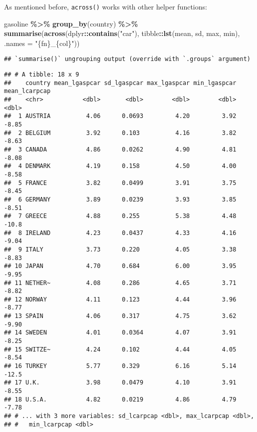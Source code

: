\documentclass[
]{article}
\newenvironment{Shaded}{\begin{snugshade}}{\end{snugshade}}
\newcommand{\DataTypeTok}[1]{\textcolor[rgb]{0.13,0.29,0.53}{#1}}
\newcommand{\KeywordTok}[1]{\textcolor[rgb]{0.13,0.29,0.53}{\textbf{#1}}}
\newcommand{\NormalTok}[1]{#1}
\newcommand{\OperatorTok}[1]{\textcolor[rgb]{0.81,0.36,0.00}{\textbf{#1}}}
\newcommand{\StringTok}[1]{\textcolor[rgb]{0.31,0.60,0.02}{#1}}
\begin{document}
As mentioned before, \texttt{across()} works with other helper functions:

\begin{Shaded}
\begin{Highlighting}[]
\NormalTok{gasoline }\OperatorTok{\%\textgreater{}\%}
\StringTok{  }\KeywordTok{group\_by}\NormalTok{(country) }\OperatorTok{\%\textgreater{}\%}
\StringTok{  }\KeywordTok{summarise}\NormalTok{(}\KeywordTok{across}\NormalTok{(dplyr}\OperatorTok{::}\KeywordTok{contains}\NormalTok{(}\StringTok{"car"}\NormalTok{), tibble}\OperatorTok{::}\KeywordTok{lst}\NormalTok{(mean, sd, max, min), }\DataTypeTok{.names =} \StringTok{"\{fn\}\_\{col\}"}\NormalTok{))}
\end{Highlighting}
\end{Shaded}

\begin{verbatim}
## `summarise()` ungrouping output (override with `.groups` argument)
\end{verbatim}

\begin{verbatim}
## # A tibble: 18 x 9
##    country mean_lgaspcar sd_lgaspcar max_lgaspcar min_lgaspcar mean_lcarpcap
##    <chr>           <dbl>       <dbl>        <dbl>        <dbl>         <dbl>
##  1 AUSTRIA          4.06      0.0693         4.20         3.92         -8.85
##  2 BELGIUM          3.92      0.103          4.16         3.82         -8.63
##  3 CANADA           4.86      0.0262         4.90         4.81         -8.08
##  4 DENMARK          4.19      0.158          4.50         4.00         -8.58
##  5 FRANCE           3.82      0.0499         3.91         3.75         -8.45
##  6 GERMANY          3.89      0.0239         3.93         3.85         -8.51
##  7 GREECE           4.88      0.255          5.38         4.48        -10.8 
##  8 IRELAND          4.23      0.0437         4.33         4.16         -9.04
##  9 ITALY            3.73      0.220          4.05         3.38         -8.83
## 10 JAPAN            4.70      0.684          6.00         3.95         -9.95
## 11 NETHER~          4.08      0.286          4.65         3.71         -8.82
## 12 NORWAY           4.11      0.123          4.44         3.96         -8.77
## 13 SPAIN            4.06      0.317          4.75         3.62         -9.90
## 14 SWEDEN           4.01      0.0364         4.07         3.91         -8.25
## 15 SWITZE~          4.24      0.102          4.44         4.05         -8.54
## 16 TURKEY           5.77      0.329          6.16         5.14        -12.5 
## 17 U.K.             3.98      0.0479         4.10         3.91         -8.55
## 18 U.S.A.           4.82      0.0219         4.86         4.79         -7.78
## # ... with 3 more variables: sd_lcarpcap <dbl>, max_lcarpcap <dbl>,
## #   min_lcarpcap <dbl>
\end{verbatim}
\end{document}
